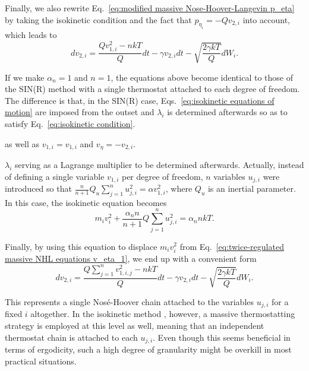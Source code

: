 \documentclass[
aip,
jcp,
reprint,
]{revtex4-1}
\newcommand{\nn}{n}
\begin{document}
Finally, we also rewrite Eq.~\eqref{eq:modified massive Nose-Hoover-Langevin p_eta} by taking the isokinetic condition and the fact that $p_{\eta_i} = -Q v_{2,i}$ into account, which leads to
\begin{equation}
dv_{2,i} = \frac{Q v_{1,i}^2 - \nn k T}{Q} dt - \gamma v_{2,i} dt - \sqrt{\frac{2 \gamma k T}{Q}} dW_i.
\end{equation}

If we make $\alpha_\nn=1$ and $\nn=1$, the equations above become identical to those of the SIN(R) method \cite{Leimkuhler_2013} with a single thermostat attached to each degree of freedom.
The difference is that, in the SIN(R) case, Eqs.~\eqref{eq:isokinetic equations of motion} are imposed from the outset and $\lambda_i$ is determined afterwards so as to satisfy Eq.~\eqref{eq:isokinetic condition}.




 as well as $v_{1,i} = v_{1,i}$ and $v_\eta = -v_{2,i}$.


$\lambda_i$ serving as a Lagrange multiplier to be determined afterwards.
Actually, instead of defining a single variable $v_{1,i}$ per degree of freedom, $\nn$ variables $u_{j, i}$ were introduced so that $\frac{\nn}{\nn+1} Q_u \sum_{j=1}^\nn u_{j, i}^2 = \alpha v_{1,i}^2$, where $Q_u$ is an inertial parameter.
In this case, the isokinetic equation becomes
\begin{equation}
m_i v_i^2 + \frac{\alpha_\nn \nn}{\nn+1} Q \sum_{j=1}^\nn u_{j, i}^2 = \alpha_\nn \nn k T.
\end{equation}

Finally, by using this equation to displace $m_i v_i^2$ from Eq.~\eqref{eq:twice-regulated massive NHL equations v_eta_1}, we end up with a convenient form
\begin{equation}
dv_{2,i} = \frac{Q \sum\limits_{j=1}^\nn v_{1,i,j}^2 - \nn k T}{Q} dt - \gamma v_{2,i} dt - \sqrt{\frac{2 \gamma k T}{Q}} dW_i.
\end{equation}

This represents a single Nos\'{e}-Hoover chain attached to the variables $u_{j, i}$ for a fixed $i$ altogether.
In the isokinetic method \cite{Minary_2004}, however, a massive thermostatting strategy is employed at this level as well, meaning that an independent thermostat chain is attached to each $u_{j, i}$.
Even though this seems beneficial in terms of ergodicity, such a high degree of granularity might be overkill in most practical situations.
\end{document}
